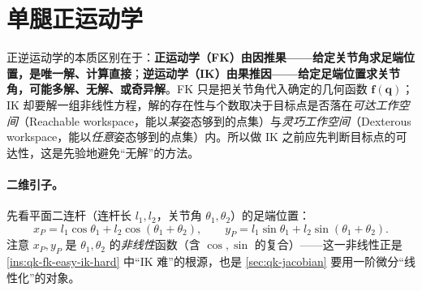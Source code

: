 \section{单腿正运动学}
\label{sec:qk-fk}

\begin{insight}[K4：FK 易、IK 难（运动学的根本不对称）]\label{ins:qk-fk-easy-ik-hard}
正逆运动学的本质区别在于：\textbf{正运动学（FK）由因推果——给定关节角求足端位置，是唯一解、计算直接}；\textbf{逆运动学（IK）由果推因——给定足端位置求关节角，可能多解、无解、或奇异解}。FK 只是把关节角代入确定的几何函数 $\boldsymbol{f}(\boldsymbol{q})$；IK 却要解一组非线性方程，解的存在性与个数取决于目标点是否落在\emph{可达工作空间}（Reachable workspace，能以\emph{某}姿态够到的点集）与\emph{灵巧工作空间}（Dexterous workspace，能以\emph{任意}姿态够到的点集）内。所以做 IK 之前应先判断目标点的可达性，这是先验地避免“无解”的方法。
\end{insight}

\paragraph{二维引子。}
先看平面二连杆（连杆长 $l_1,l_2$，关节角 $\theta_1,\theta_2$）的足端位置\cite{unitree2023quadruped}：
\begin{equation}
  x_P=l_1\cos\theta_1+l_2\cos(\theta_1+\theta_2),
  \qquad
  y_P=l_1\sin\theta_1+l_2\sin(\theta_1+\theta_2).
  \label{eq:qk-2d-fk}
\end{equation}
注意 $x_P,y_P$ 是 $\theta_1,\theta_2$ 的\emph{非线性}函数（含 $\cos,\sin$ 的复合）——这一非线性正是 \cref{ins:qk-fk-easy-ik-hard} 中“IK 难”的根源，也是 \cref{sec:qk-jacobian} 要用一阶微分“线性化”的对象。


